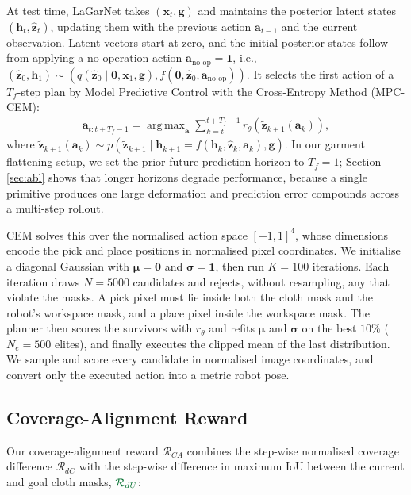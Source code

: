 \documentclass[journal]{IEEEtran}
\DeclareMathOperator*{\argmax}{arg\,max}
\newif\ifshowrev\showrevtrue
\newcommand{\rev}[1]{\ifshowrev\textcolor{revblue}{#1}\else#1\fi}
\newif\ifshowirev\showirevtrue
\newcommand{\irev}[1]{\ifshowirev\textcolor{irevgreen}{#1}\else#1\fi}
\newif\ifshowrrev\showrrevtrue
\newcommand{\rrev}[1]{\ifshowrrev\textcolor{rrevred}{#1}\else#1\fi}
\begin{document}
\rev{At test time, LaGarNet takes $(\bm{x}_t, \bm{g})$ and maintains the posterior latent states $(\bm{h}_t, \hat{\bm{z}}_t)$, updating them with the previous action $\bm{a}_{t-1}$ and the current observation. Latent vectors start at zero, and the initial posterior states follow from applying a no-operation action $\bm{a}_{\text{no-op}} = \bm{1}$\rrev{, i.e.,} $(\hat{\bm{z}}_0, \bm{h}_1) \sim (q(\hat{\bm{z}}_0 \;|\; \bm{0}, \bm{x}_1, \bm{g}), f(\bm{0}, \hat{\bm{z}}_{0}, \bm{a}_{\text{no-op}}))$.}
\rev{It selects the first action of a $T_f$-step plan by Model Predictive Control with the Cross-Entropy Method (MPC-CEM):}
\begin{align}
   \bm{a}_{t:t+T_f-1} = \argmax_{\bm{a}} \sum_{k=t}^{t+T_f-1} r_\theta(\tilde{\bm{z}}_{k+1}(\bm{a}_k)),
\end{align}
where $\tilde{\bm{z}}_{k+1}(\bm{a}_k) \sim p(\tilde{\bm{z}}_{k+1} \;|\; \bm{h}_{k+1}=f(\bm{h}_k, \hat{\bm{z}}_k, \bm{a}_k), \bm{g})$. In our garment flattening setup, we set the prior future prediction horizon to $T_f=1$\rrev{;} \irev{Section \ref{sec:abl} shows that longer horizons degrade performance, because a single primitive produces one large deformation and prediction error compounds across a multi-step rollout}.

\rev{CEM solves this over the normalised action space $[-1,1]^4$, whose dimensions encode the pick and place positions in normalised pixel coordinates. We initialise a diagonal Gaussian with $\bm{\mu}=\bm{0}$ and $\bm{\sigma}=\bm{1}$, then run $K=100$ iterations. Each iteration draws $N=5000$ candidates and rejects, without resampling, any that violate the masks. A pick pixel must lie inside both the cloth mask and the robot's workspace mask, and a place pixel inside the workspace mask. The planner then scores the survivors with $r_\theta$ and refits $\bm{\mu}$ and $\bm{\sigma}$ on the best $10\%$ ($N_e=500$ elites), and finally executes the clipped mean of the last distribution. We sample and score every candidate in normalised image coordinates, and convert only the executed action into a metric robot pose.}

\subsection{Coverage-Alignment Reward}  \label{sec:ca-reward}

\rev{Our coverage-alignment reward $\mathcal{R}_{CA}$ combines the step-wise normalised coverage difference $\mathcal{R}_{dC}$ with the step-wise difference in maximum IoU between the current and goal cloth masks, $\irev{\mathcal{R}_{dU}}$:} 
\end{document}
